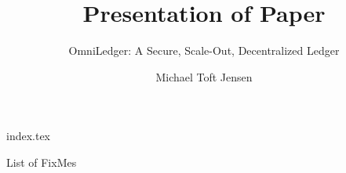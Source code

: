 \documentclass[12pt, aspectratio=169]{beamer}
\title{Presentation of Paper}
\subtitle{OmniLedger: A Secure, Scale-Out, Decentralized Ledger}
\date{}
\author{Michael Toft Jensen}
\begin{document}
\maketitle
{}

{index.tex}

\renewcommand\appendixname{Appendix}
\appendix


\begin{frame}{List of FixMes}
    \listoffixmes
\end{frame}
\end{document}
